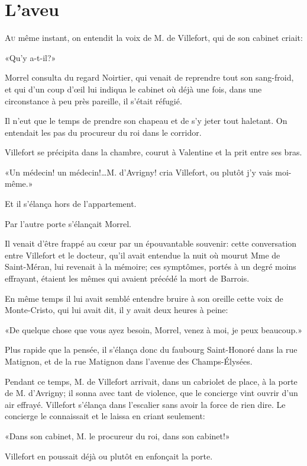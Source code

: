 \chapter{L'aveu}

\lettrine{A}{u} même instant, on entendit la voix de M. de Villefort, qui de son cabinet criait: 

\zz
«Qu'y a-t-il?» 

\zz
Morrel consulta du regard Noirtier, qui venait de reprendre tout son sang-froid, et qui d'un coup d'œil lui indiqua le cabinet où déjà une fois, dans une circonstance à peu près pareille, il s'était réfugié. 

Il n'eut que le temps de prendre son chapeau et de s'y jeter tout haletant. On entendait les pas du procureur du roi dans le corridor. 

Villefort se précipita dans la chambre, courut à Valentine et la prit entre ses bras. 

«Un médecin! un médecin!\dots M. d'Avrigny! cria Villefort, ou plutôt j'y vais moi-même.» 

Et il s'élança hors de l'appartement. 

Par l'autre porte s'élançait Morrel. 

Il venait d'être frappé au cœur par un épouvantable souvenir: cette conversation entre Villefort et le docteur, qu'il avait entendue la nuit où mourut Mme de Saint-Méran, lui revenait à la mémoire; ces symptômes, portés à un degré moins effrayant, étaient les mêmes qui avaient précédé la mort de Barrois. 

En même temps il lui avait semblé entendre bruire à son oreille cette voix de Monte-Cristo, qui lui avait dit, il y avait deux heures à peine: 

«De quelque chose que vous ayez besoin, Morrel, venez à moi, je peux beaucoup.» 

Plus rapide que la pensée, il s'élança donc du faubourg Saint-Honoré dans la rue Matignon, et de la rue Matignon dans l'avenue des Champs-Élysées. 

Pendant ce temps, M. de Villefort arrivait, dans un cabriolet de place, à la porte de M. d'Avrigny; il sonna avec tant de violence, que le concierge vint ouvrir d'un air effrayé. Villefort s'élança dans l'escalier sans avoir la force de rien dire. Le concierge le connaissait et le laissa en criant seulement: 

«Dans son cabinet, M. le procureur du roi, dans son cabinet!» 

Villefort en poussait déjà ou plutôt en enfonçait la porte. 

